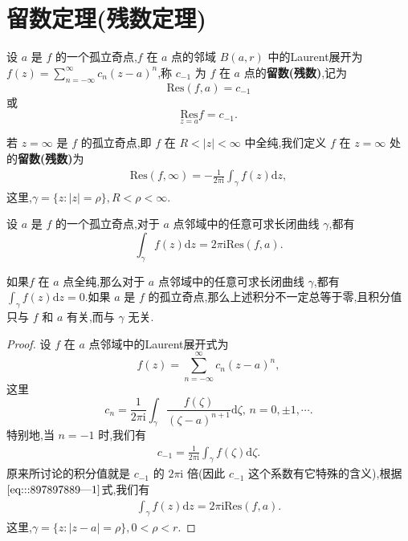 \documentclass[../../main.tex]{subfiles}
\begin{document}
\section{留数定理(残数定理)}

\begin{definition}
设 \( a \) 是 \( f \) 的一个孤立奇点,\( f \) 在 \( a \) 点的邻域 \( B(a,r) \) 中的Laurent展开为 \( f(z) = \sum_{n = -\infty}^{\infty} c_n (z - a)^n \),称 \( c_{-1} \) 为 \( f \) 在 \( a \) 点的\textbf{留数(残数)},记为
\[
\mathrm{Res}(f,a) = c_{-1}
\]
或
\[
\underset{z = a}{\mathrm{Res}} f = c_{-1}.
\]

若 \( z = \infty \) 是 \( f \) 的孤立奇点,即 \( f \) 在 \( R < |z| < \infty \) 中全纯,我们定义 \( f \) 在 \( z = \infty \) 处的\textbf{留数(残数)}为
\begin{align}
\mathrm{Res}(f,\infty) = -\frac{1}{2\pi \mathrm{i}} \int_{\gamma} f(z) \mathrm{d}z, \label{eq:::897897889---3}
\end{align}
这里,\( \gamma = \{ z: |z| = \rho \}, R < \rho < \infty \).
\end{definition}

\begin{proposition}\label{proposition:积分与留数的关系}
设 \( a \) 是 \( f \) 的一个孤立奇点,对于 \( a \) 点邻域中的任意可求长闭曲线 \( \gamma \),都有$$\int_{\gamma} f(z) \mathrm{d}z = 2\pi \mathrm{i} \mathrm{Res}(f,a).$$
\end{proposition}
\begin{remark}
如果\( f \) 在 \( a \) 点全纯,那么对于 \( a \) 点邻域中的任意可求长闭曲线 \( \gamma \),都有 \( \int_{\gamma} f(z) \mathrm{d}z = 0 \).如果 \( a \) 是 \( f \) 的孤立奇点,那么上述积分不一定总等于零,且积分值只与 \( f \) 和 \( a \) 有关,而与 \( \gamma \) 无关.
\end{remark}
\begin{proof}
设 \( f \) 在 \( a \) 点邻域中的Laurent展开式为
\[
f(z) = \sum_{n = -\infty}^{\infty} c_n (z - a)^n,
\]
这里
\[
c_n = \frac{1}{2\pi \mathrm{i}} \int_{\gamma} \frac{f(\zeta)}{(\zeta - a)^{n + 1}} \mathrm{d}\zeta, \, n = 0, \pm 1, \cdots.
\]
特别地,当 \( n = -1 \) 时,我们有
\begin{align}
c_{-1} = \frac{1}{2\pi \mathrm{i}} \int_{\gamma} f(\zeta) \mathrm{d}\zeta. \label{eq:::897897889---1}
\end{align}
原来所讨论的积分值就是 \( c_{-1} \) 的 \( 2\pi \mathrm{i} \) 倍(因此 \( c_{-1} \) 这个系数有它特殊的含义),根据\(\eqref{eq:::897897889---1}\)式,我们有
\begin{align}
\int_{\gamma} f(z) \mathrm{d}z = 2\pi \mathrm{i} \mathrm{Res}(f,a). \label{eq:::897897889---2}
\end{align}
这里,\( \gamma = \{ z: |z - a| = \rho \}, 0 < \rho < r \).
\end{proof}
\end{document}
